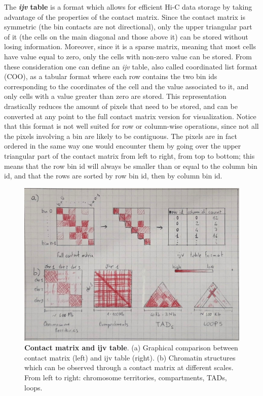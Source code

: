 The \textbf{\emph{ijv} table} is a format which allows for efficient Hi-C data storage by taking advantage of the properties of the contact matrix. Since the contact matrix is symmetric (the bin contacts are not directional), only the upper triangular part of it (the cells on the main diagonal and those above it) can be stored without losing information. Moreover, since it is a sparse matrix, meaning that most cells have value equal to zero, only the cells with non-zero value can be stored. From these consideration one can define an \emph{ijv} table, also called coordinated list format (COO), as a tabular format where each row contains the two bin ids corresponding to the coordinates of the cell and the value associated to it, and only cells with a value greater than zero are stored. This representation drastically reduces the amount of pixels that need to be stored, and can be converted at any point to the full contact matrix version for visualization. Notice that this format is not well suited for row or column-wise operations, since not all the pixels involving a bin are likely to be contiguous. The pixels are in fact ordered in the same way one would encounter them by going over the upper triangular part of the contact matrix from left to right, from top to bottom; this means that the row bin id will always be smaller than or equal to the column bin id, and that the rows are sorted by row bin id, then by column bin id.

\begin{figure}[ht]
  \centering
  \includegraphics[width=1\textwidth]{contact_matrix.jpeg}
  \caption{\textbf{Contact matrix and ijv table}. (a) Graphical comparison between contact matrix (left) and ijv table (right). (b) Chromatin structures which can be observed through a contact matrix at different scales. From left to right: chromosome territories, compartments, TADs, loops.}
  \label{fig:contacts}
\end{figure}

